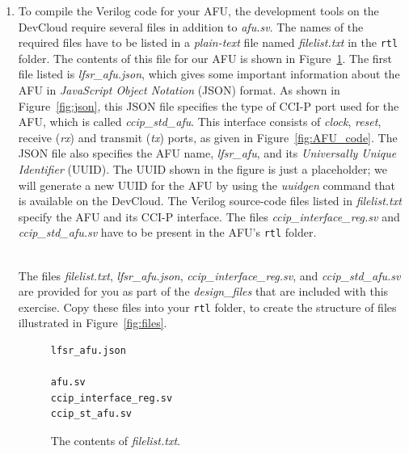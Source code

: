 \documentclass[epsfig,10pt,fullpage]{article}
\begin{document}
\begin{enumerate}
\item
To compile the Verilog code for your AFU, the development tools on the DevCloud require
several files in addition to {\it afu.sv}. The names of the 
required files have to be listed in a
{\it plain-text} file named {\it filelist.txt} in the \texttt{rtl} folder. The contents of 
this file for our AFU is shown in Figure~\ref{fig:filelist}. The first file listed is 
{\it lfsr\_afu.json}, which gives some important information about the AFU in 
{\it JavaScript Object Notation} (JSON) format. As shown in
Figure~\ref{fig:json}, this JSON file specifies the type of CCI-P port used for the
AFU, which is called {\it ccip\_std\_afu}. This interface consists of 
{\it clock}, {\it reset}, receive ({\it rx}) and transmit ({\it tx}) ports, as given 
in Figure~\ref{fig:AFU_code}. The JSON file also specifies the AFU name, 
{\it lfsr\_afu}, and its {\it Universally Unique Identifier} (UUID). The UUID shown in the
figure is just a placeholder; we will generate a new UUID for the AFU by using the
{\it uuidgen} command that is available on the DevCloud. The Verilog source-code files listed in
{\it filelist.txt} specify the AFU and its CCI-P interface. The files
{\it ccip\_interface\_reg.sv} and {\it ccip\_std\_afu.sv} have to be present in the AFU's 
\texttt{rtl} folder.

~\\
\noindent
The files {\it filelist.txt}, {\it lfsr\_afu.json}, {\it ccip\_interface\_reg.sv}, and 
{\it ccip\_std\_afu.sv} are provided for you as part of the {\it design\_files}
that are included with this exercise. Copy these files into your \texttt{rtl} folder, to
create the structure of files illustrated in Figure~\ref{fig:files}.

\lstset{language=C,numbers=none,escapechar=|}
\begin{figure}[H]
\begin{center}
\begin{minipage}[h]{4.5 cm}
\begin{lstlisting}[name=filelist]
lfsr_afu.json

afu.sv
ccip_interface_reg.sv
ccip_st_afu.sv
\end{lstlisting}
\end{minipage}
\caption{The contents of {\it filelist.txt}.}
\label{fig:filelist}
\end{center}
\end{figure}


\end{enumerate}
\end{document}
